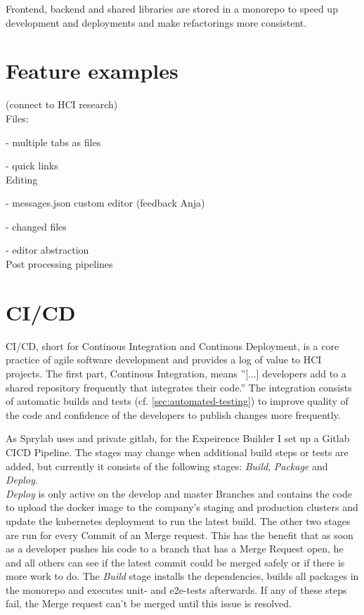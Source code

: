 Frontend, backend and shared libraries are stored in a monorepo to speed up development and deployments and make refactorings more consistent.

\section{Feature examples}

(connect to HCI research)
\\
Files:

- multiple tabs as files

- quick links
\\
Editing

- messages.json custom editor (feedback Anja)

- changed files

- editor abstraction
\\
Post processing pipelines


\section{CI/CD}

CI/CD, short for Continous Integration and Continous Deployment, is a core practice of agile software development and provides a log of value to
HCI projects. The first part, Continous Integration, means ''[...] developers add to a shared repository frequently that integrates their code.'' \cite[p. 81]{LearnHCI:2020ys}
The integration consists of automatic builds and tests (cf. \ref*{sec:automated-testing}) to improve quality of the code and confidence of the developers to publish changes more frequently.

As Sprylab uses and private gitlab, for the Expeirence Builder I set up a Gitlab CICD Pipeline. The stages may change when additional build steps or tests are added, but currently it consists of the following stages: \textit{Build}, \textit{Package} and \textit{Deploy}.
\\
\textit{Deploy} is only active on the develop and master Branches and contains the code to upload the docker image to the company's staging and production clusters and update the kubernetes deployment to run the latest build.
The other two stages are run for every Commit of an Merge request. This has the benefit that as soon as a developer pushes his code to a branch that has a Merge Request open,
he and all others can see if the latest commit could be merged safely or if there is more work to do.
The \textit{Build} stage installs the dependencies, builds all packages in the monorepo and executes unit- and e2e-tests afterwards. If any of these steps fail, the Merge request can't be merged until this issue is resolved.

